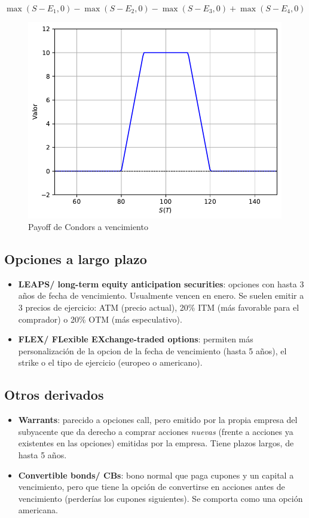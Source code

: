 \begin{itemize}
    \[\boxed{\max(S-E_1, 0) - \max(S-E_2, 0) - \max(S-E_3, 0) + \max(S-E_4, 0)}\]
    \begin{figure}[H]
        \centering
        \includegraphics[width=0.5\linewidth]{Imagenes/Parte1/2_Derivados/CondorsPayoff.pdf}
        \caption{Payoff de Condors a vencimiento}
    \end{figure}
\end{itemize}



\subsection{Opciones a largo plazo}
\begin{itemize}
    \item \textbf{LEAPS/ long-term equity anticipation securities}: opciones con hasta 3 años de fecha de vencimiento. Usualmente vencen en enero. Se suelen emitir a 3 precios de ejercicio: ATM (precio actual), 20\% ITM (más favorable para el comprador) o 20\% OTM (más especulativo).
    \item \textbf{FLEX/ FLexible EXchange-traded options}: permiten más personalización de la opcion de la fecha de vencimiento (hasta 5 años), el strike o el tipo de ejercicio (europeo o americano).
\end{itemize}


\subsection{Otros derivados}
\begin{itemize}
    \item \textbf{Warrants}: parecido a opciones call, pero emitido por la propia empresa del subyacente que da derecho a comprar acciones \textit{nuevas} (frente a acciones ya existentes en las opciones) emitidas por la empresa. Tiene plazos largos, de hasta 5 años.
    \item \textbf{Convertible bonds/ CBs}: bono normal que paga cupones y un capital a vencimiento, pero que tiene la opción de convertirse en acciones antes de vencimiento (perderías los cupones siguientes). Se comporta como una opción americana.
\end{itemize}










